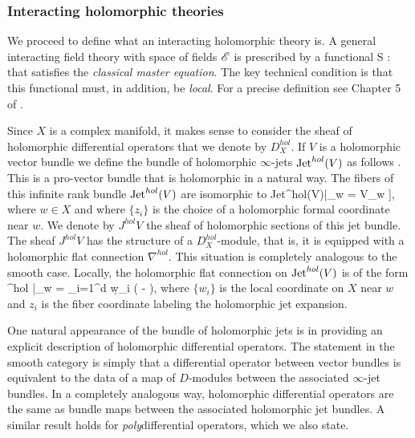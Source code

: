 \documentclass[11pt]{amsart}
\begin{document}
\subsubsection{Interacting holomorphic theories} \label{sec: interacting}

\def\olochol{\sO_{\rm loc}^{hol}}

We proceed to define what an interacting holomorphic theory is.
A general interacting field theory with space of fields $\mathscr E$ is prescribed by a functional
\ben
S : \sE \to \CC
\een
that satisfies the {\em classical master equation}.
The key technical condition is that this functional must, in addition, be {\em local}.
For a precise definition see Chapter 5 of \cite{CG2}.



Since $X$ is a complex manifold, it makes sense to consider the sheaf of holomorphic differential operators that we denote by $D_X^{hol}$. 
If $V$ is a holomorphic vector bundle we define the bundle of holomorphic $\infty$-jets ${\rm Jet}^{hol}(V)$ as follows \cite{GriffithsGreen, WongChandler}. 
This is a pro-vector bundle that is holomorphic in a natural way.
The fibers of this infinite rank bundle ${\rm Jet}^{hol}(V)$ are isomorphic to 
\ben
{\rm Jet}^{hol}(V)|_w = V_w \tensor \CC[[z_1,\ldots,z_d]],
\een
where $w \in X$ and where $\{z_i\}$ is the choice of a holomorphic formal coordinate near $w$. 
We denote by $J^{hol} V$ the sheaf of holomorphic sections of this jet bundle.
The sheaf $J^{hol}V$ has the structure of a $D_X^{hol}$-module, that is, it is equipped with a holomorphic flat connection $\nabla^{hol}$.
This situation is completely analogous to the smooth case.
Locally, the holomorphic flat connection on ${\rm Jet}^{hol}(V)$ is of the form
\ben
\nabla^{hol} |_w = \sum_{i=1}^d \d w_i \left( - \right),
\een
where $\{w_i\}$ is the local coordinate on $X$ near $w$ and $z_i$ is the fiber coordinate labeling the holomorphic jet expansion.

One natural appearance of the bundle of holomorphic jets is in providing an explicit description of holomorphic differential operators. 
The statement in the smooth category is simply that a differential operator between vector bundles is equivalent to the data of a map of $D$-modules between the associated $\infty$-jet bundles.
In a completely analogous way, holomorphic differential operators are the same as bundle maps between the associated holomorphic jet bundles. 
A similar result holds for {\em poly}differential operators, which we also state.
\end{document}
